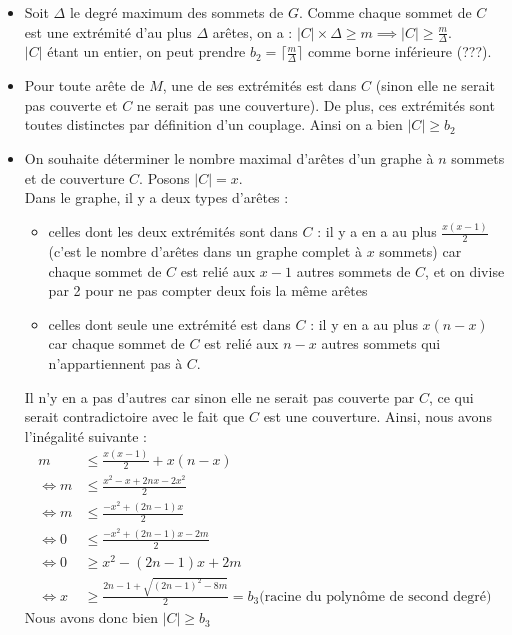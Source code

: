 \documentclass[12pt]{article}
\begin{document}
        \begin{itemize}
            \item Soit $\Delta$ le degré maximum des sommets de $G$. Comme chaque sommet de $C$ est une extrémité d'au plus $\Delta$ arêtes, on a : $|C| \times \Delta \geq m \implies |C| \geq \frac{m}{\Delta}$. \\
            $|C|$ étant un entier, on peut prendre $b_2 = \lceil \frac{m}{\Delta} \rceil$ comme borne inférieure (???). 
            \item Pour toute arête de $M$, une de ses extrémités est dans $C$ (sinon elle ne serait pas couverte et $C$ ne serait pas une couverture). De plus, ces extrémités sont toutes distinctes par définition d'un couplage. Ainsi on a bien $\boxed{|C| \geq b_2}$
            \item On souhaite déterminer le nombre maximal d'arêtes d'un graphe à $n$ sommets et de couverture $C$. Posons $|C| = x$. \\
            Dans le graphe, il y a deux types d'arêtes :
            \begin{itemize}
                \item celles dont les deux extrémités sont dans $C$ : il y a en a au plus $\frac{x(x-1)}{2}$ (c'est le nombre d'arêtes dans un graphe complet à $x$ sommets) car chaque sommet de $C$ est relié aux $x-1$ autres sommets de $C$, et on divise par 2 pour ne pas compter deux fois la même arêtes
                \item celles dont seule une extrémité est dans $C$ : il y en a au plus $x(n-x)$ car chaque sommet de $C$ est relié aux $n-x$ autres sommets qui n'appartiennent pas à $C$.
            \end{itemize}
            Il n'y en a pas d'autres car sinon elle ne serait pas couverte par $C$, ce qui serait contradictoire avec le fait que $C$ est une couverture.
            Ainsi, nous avons l'inégalité suivante :
            \begin{align*}
                m &\leq \frac{x(x-1)}{2} + x(n-x) \\
                \iff m &\leq \frac{x^2 - x + 2nx - 2x^2}{2} \\
                \iff m &\leq \frac{-x^2 + (2n-1)x}{2} \\
                \iff 0 &\leq \frac{-x^2 +(2n-1)x - 2m}{2} \\
                \iff 0 &\geq x^2 -(2n-1)x + 2m \\
                \iff x &\geq \frac{2n-1 + \sqrt{(2n-1)^2 - 8m}}{2} = b_3 \text{(racine du polynôme de second degré)}
            \end{align*}
            Nous avons donc bien $\boxed{|C| \geq b_3}$
        \end{itemize}
\end{document}
